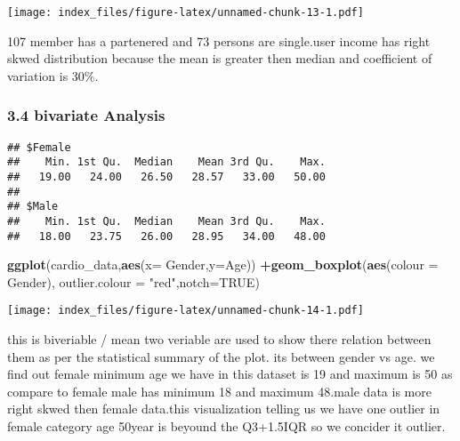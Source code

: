 \documentclass[
]{article}
\newenvironment{Shaded}{\begin{snugshade}}{\end{snugshade}}
\newcommand{\CommentTok}[1]{\textcolor[rgb]{0.56,0.35,0.01}{\textit{#1}}}
\newcommand{\DataTypeTok}[1]{\textcolor[rgb]{0.13,0.29,0.53}{#1}}
\newcommand{\KeywordTok}[1]{\textcolor[rgb]{0.13,0.29,0.53}{\textbf{#1}}}
\newcommand{\NormalTok}[1]{#1}
\newcommand{\OperatorTok}[1]{\textcolor[rgb]{0.81,0.36,0.00}{\textbf{#1}}}
\newcommand{\OtherTok}[1]{\textcolor[rgb]{0.56,0.35,0.01}{#1}}
\newcommand{\StringTok}[1]{\textcolor[rgb]{0.31,0.60,0.02}{#1}}
\begin{document}
\texttt{[image: index\_files/figure-latex/unnamed-chunk-13-1.pdf]}

107 member has a partenered and 73 persons are single.user income has
right skwed distribution because the mean is greater then median and
coefficient of variation is 30\%.

\hypertarget{bivariate-analysis}{%
\subsubsection{3.4 bivariate Analysis}\label{bivariate-analysis}}

\begin{Shaded}
\end{Shaded}

\begin{verbatim}
## $Female
##    Min. 1st Qu.  Median    Mean 3rd Qu.    Max. 
##   19.00   24.00   26.50   28.57   33.00   50.00 
## 
## $Male
##    Min. 1st Qu.  Median    Mean 3rd Qu.    Max. 
##   18.00   23.75   26.00   28.95   34.00   48.00
\end{verbatim}

\begin{Shaded}
\begin{Highlighting}[]
\KeywordTok{ggplot}\NormalTok{(cardio_data,}\KeywordTok{aes}\NormalTok{(}\DataTypeTok{x=}\NormalTok{ Gender,}\DataTypeTok{y=}\NormalTok{Age)) }\OperatorTok{+}\KeywordTok{geom_boxplot}\NormalTok{(}\KeywordTok{aes}\NormalTok{(}\DataTypeTok{colour =}\NormalTok{ Gender), }\DataTypeTok{outlier.colour =} \StringTok{"red"}\NormalTok{,}\DataTypeTok{notch=}\OtherTok{TRUE}\NormalTok{) }
\end{Highlighting}
\end{Shaded}

\texttt{[image: index\_files/figure-latex/unnamed-chunk-14-1.pdf]}

this is biveriable / mean two veriable are used to show there relation
between them as per the statistical summary of the plot. its between
gender vs age. we find out female minimum age we have in this dataset is
19 and maximum is 50 as compare to female male has minimum 18 and
maximum 48.male data is more right skwed then female data.this
visualization telling us we have one outlier in female category age
50year is beyound the Q3+1.5IQR so we concider it outlier.
\end{document}

